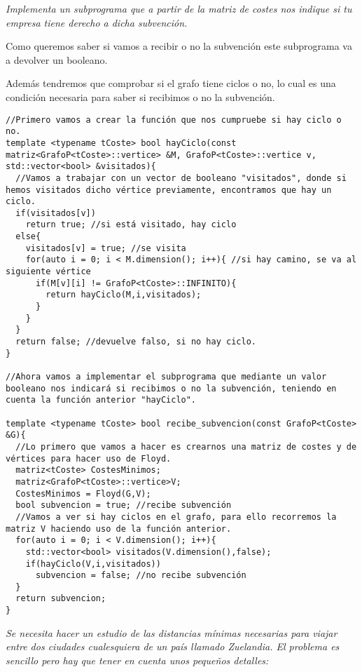 \textit{Implementa un subprograma que a partir de la matriz de costes nos indique si tu empresa tiene derecho a dicha subvención.}

Como queremos saber si vamos a recibir o no la subvención este subprograma va a devolver un booleano.

Además tendremos que comprobar si el grafo tiene ciclos o no, lo cual es una condición necesaria para saber si recibimos o no la subvención.

\begin{verbatim}
//Primero vamos a crear la función que nos cumpruebe si hay ciclo o no.
template <typename tCoste> bool hayCiclo(const matriz<GrafoP<tCoste>::vertice> &M, GrafoP<tCoste>::vertice v, std::vector<bool> &visitados){
  //Vamos a trabajar con un vector de booleano "visitados", donde si hemos visitados dicho vértice previamente, encontramos que hay un ciclo.
  if(visitados[v]) 
    return true; //si está visitado, hay ciclo
  else{
    visitados[v] = true; //se visita
    for(auto i = 0; i < M.dimension(); i++){ //si hay camino, se va al siguiente vértice
      if(M[v][i] != GrafoP<tCoste>::INFINITO){
        return hayCiclo(M,i,visitados); 
      }
    }
  }
  return false; //devuelve falso, si no hay ciclo.
}

//Ahora vamos a implementar el subprograma que mediante un valor booleano nos indicará si recibimos o no la subvención, teniendo en cuenta la función anterior "hayCiclo".

template <typename tCoste> bool recibe_subvencion(const GrafoP<tCoste> &G){
  //Lo primero que vamos a hacer es crearnos una matriz de costes y de vértices para hacer uso de Floyd.
  matriz<tCoste> CostesMinimos;
  matriz<GrafoP<tCoste>::vertice>V;
  CostesMinimos = Floyd(G,V);
  bool subvencion = true; //recibe subvención
  //Vamos a ver si hay ciclos en el grafo, para ello recorremos la matriz V haciendo uso de la función anterior.
  for(auto i = 0; i < V.dimension(); i++){
    std::vector<bool> visitados(V.dimension(),false);
    if(hayCiclo(V,i,visitados))
      subvencion = false; //no recibe subvención
  }
  return subvencion;
}
\end{verbatim}
\newpage
\textbf{\large{}}\textit{ Se necesita hacer un estudio de las distancias mínimas necesarias para viajar entre dos ciudades cualesquiera de un país llamado Zuelandia. El problema es sencillo pero hay que tener en cuenta unos pequeños detalles:}
